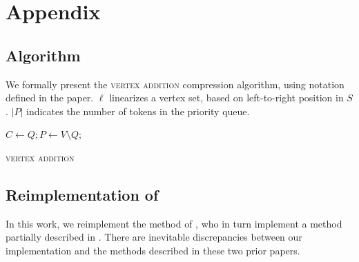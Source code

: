 \appendix

\section{Appendix}

\subsection{Algorithm}
We formally present the \textsc{vertex addition} compression algorithm, using notation defined in the paper. $\ell$ linearizes a vertex set, based on left-to-right position in $S$. $|P|$ indicates the number of tokens in the priority queue.

\begin{algorithm}[]
\SetAlgoLined
{}
 $ C \gets Q;  P \gets V \setminus Q$; \\
 \caption{\textsc{vertex addition}}
\end{algorithm}\label{a:algo}

\subsection{Reimplementation of \citet{filippova2013overcoming}}

In this work, we reimplement the method of \citet{filippova2013overcoming}, who in turn implement a method partially described in \citet{filippova2008dependency}.  There are inevitable discrepancies between our implementation and the methods described in these two prior papers.

